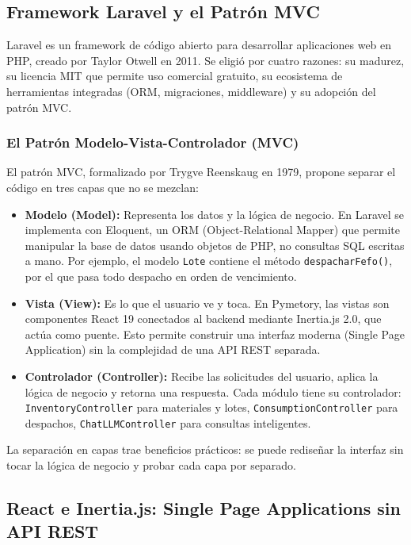 \subsection{Framework Laravel y el Patrón MVC}
\label{sec:laravel_mvc}

Laravel es un framework de código abierto para desarrollar aplicaciones web en PHP, creado por Taylor Otwell en 2011. Se eligió por cuatro razones: su madurez, su licencia MIT que permite uso comercial gratuito, su ecosistema de herramientas integradas (ORM, migraciones, middleware) y su adopción del patrón MVC.

\subsubsection{El Patrón Modelo-Vista-Controlador (MVC)}

El patrón MVC, formalizado por Trygve Reenskaug en 1979, propone separar el código en tres capas que no se mezclan:

\begin{itemize}
    \item \textbf{Modelo (Model):} Representa los datos y la lógica de negocio. En Laravel se implementa con Eloquent, un ORM (Object-Relational Mapper) que permite manipular la base de datos usando objetos de PHP, no consultas SQL escritas a mano. Por ejemplo, el modelo \texttt{Lote} contiene el método \texttt{despacharFefo()}, por el que pasa todo despacho en orden de vencimiento.
    
    \item \textbf{Vista (View):} Es lo que el usuario ve y toca. En Pymetory, las vistas son componentes React 19 conectados al backend mediante Inertia.js 2.0, que actúa como puente. Esto permite construir una interfaz moderna (Single Page Application) sin la complejidad de una API REST separada.
    
    \item \textbf{Controlador (Controller):} Recibe las solicitudes del usuario, aplica la lógica de negocio y retorna una respuesta. Cada módulo tiene su controlador: \texttt{InventoryController} para materiales y lotes, \texttt{ConsumptionController} para despachos, \texttt{ChatLLMController} para consultas inteligentes.
\end{itemize}

La separación en capas trae beneficios prácticos: se puede rediseñar la interfaz sin tocar la lógica de negocio y probar cada capa por separado.

\subsection{React e Inertia.js: Single Page Applications sin API REST}
\label{sec:react_inertia}

